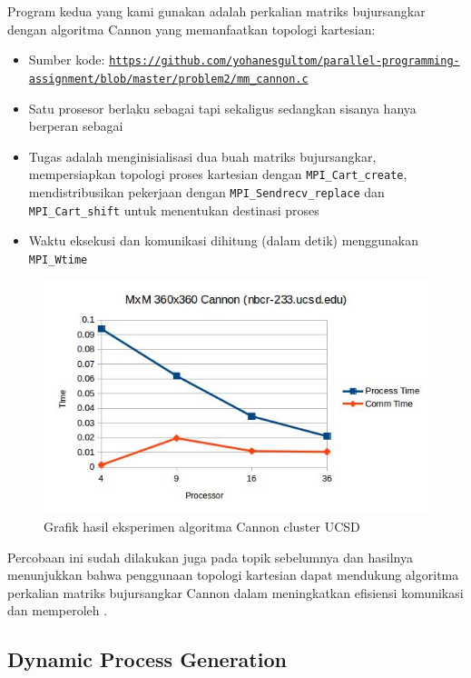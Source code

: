 Program kedua yang kami gunakan adalah perkalian matriks bujursangkar dengan algoritma Cannon yang memanfaatkan topologi kartesian:

\begin{itemize}
	\item Sumber kode: \texttt{\url{https://github.com/yohanesgultom/parallel-programming-assignment/blob/master/problem2/mm_cannon.c}}
	\item Satu prosesor berlaku sebagai \manager tapi sekaligus \worker sedangkan sisanya hanya berperan sebagai \worker 
	\item Tugas \manager adalah menginisialisasi dua buah matriks bujursangkar, mempersiapkan topologi proses kartesian dengan \verb|MPI_Cart_create|, mendistribusikan pekerjaan dengan \verb|MPI_Sendrecv_replace| dan \verb|MPI_Cart_shift| untuk menentukan destinasi proses
	\item Waktu eksekusi dan komunikasi dihitung (dalam detik) menggunakan \verb|MPI_Wtime|
\end{itemize}

\begin{figure}
	\centering
	\includegraphics[width=1\textwidth]
	{pics/chart_mm_cannon_nbcr}
	\caption{Grafik hasil eksperimen algoritma Cannon cluster UCSD}
	\label{fig:result_mm_cannon_nbcr}
\end{figure}  

Percobaan ini sudah dilakukan juga pada topik sebelumnya dan hasilnya menunjukkan bahwa penggunaan topologi kartesian dapat mendukung algoritma perkalian matriks bujursangkar Cannon dalam meningkatkan efisiensi komunikasi dan memperoleh \speedup.

\subsection{Dynamic Process Generation}

